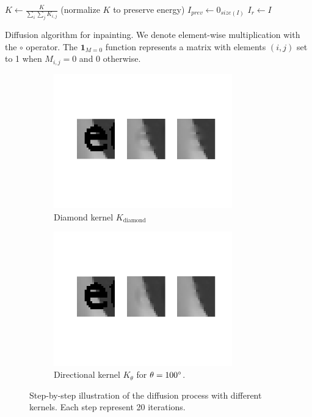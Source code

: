 \begin{algorithm}
	$K \leftarrow \frac{K}{\sum_i \sum_j K_{i,j}}$ (normalize $K$ to preserve energy)\; 
	$I_{prev} \leftarrow 0_{size(I)}$\;
	$I_{r} \leftarrow I$\;
	\quad
\caption{Diffusion algorithm for inpainting. We denote element-wise multiplication with the $\circ$ operator. The $\mathbf{1}_{M=0}$ function represents a matrix with elements $(i,j)$ set to 1 when $M_{i,j}=0$ and 0 otherwise.}
\label{alg:diffusion}
\end{algorithm}
\begin{figure}
	\centering
	\begin{subfigure}[b]{0.4\textwidth}
		\centering
		\includegraphics[clip, trim=0cm 5.2cm 0cm 4cm, width=0.85\textwidth]{figures/step-by-step-cross}
		\caption{Diamond kernel $K_{\text{diamond}}$}
		\label{fig:stepbystepcross}
	\end{subfigure}
	\begin{subfigure}[b]{0.4\textwidth}
		\centering
		\includegraphics[clip, trim=0cm 5.2cm 0cm 4cm, width=0.85\textwidth]{figures/step-by-step-directional}
		\caption{Directional kernel $K_\theta$ for $\theta = 100\degree$.}
		\label{fig:stepbystepdir}
	\end{subfigure}
	\caption{Step-by-step illustration of the diffusion process with different kernels. Each step represent 20 iterations.}
\end{figure}